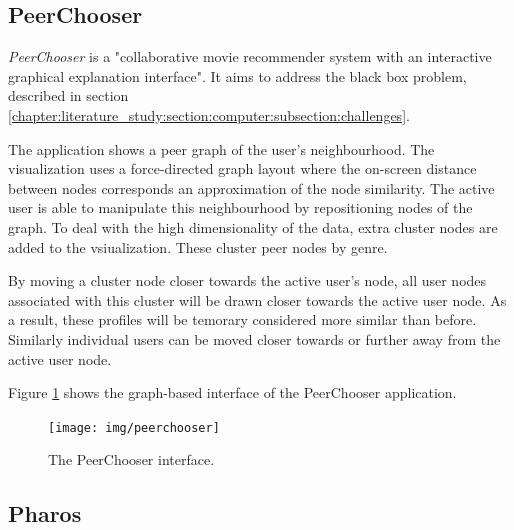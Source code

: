 

\subsection{PeerChooser}\label{chapter:survey:section:applications:subsection:peerchooser}

\emph{PeerChooser} is a "collaborative movie recommender system with an interactive graphical explanation interface"\cite{odonovan:2008}. It aims to address the black box problem, described in section \ref{chapter:literature_study:section:computer:subsection:challenges}\cite{odonovan:2008}.

The application shows a peer graph of the user's neighbourhood. The visualization uses a force-directed graph layout where the on-screen distance between nodes corresponds an approximation of the node similarity. The active user is able to manipulate this neighbourhood by repositioning nodes of the graph. To deal with the high dimensionality of the data, extra cluster nodes are added to the vsiualization. These cluster peer nodes by genre\cite{odonovan:2008}.

By moving a cluster node closer towards the active user's node, all user nodes associated with this cluster will be drawn closer towards the active user node. As a result, these profiles will be temorary considered more similar than before. Similarly individual users can be moved closer towards or further away from the active user node\cite{odonovan:2008}.

Figure \ref{figure:peerchooser} shows the graph-based interface of the PeerChooser application.

\begin{figure}%
	\begin{center}
		\texttt{[image: img/peerchooser]}%
	\end{center}
	\caption{The PeerChooser interface.}%
	\label{figure:peerchooser}%
\end{figure}



\subsection{Pharos}\label{chapter:survey:section:applications:subsection:pharos}

